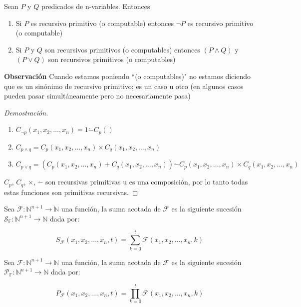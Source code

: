 \begin{proposition}
Sean $P$ y $Q$ predicados de n-variables. Entonces
 
\begin{enumerate}
	\item Si $P$ es recursivo primitivo (o computable) entonces $\neg P$ es recursivo primitivo (o computable)
	\item Si $P$ y $Q$ son recursivos primitivos (o computables) entonces $(P \wedge Q)$ y $(P \lor Q)$ son recursivos primitivos (o computables)
\end{enumerate}
 
\textbf{Observaci\'on} Cuando estamos poniendo ``(o computables)" no estamos diciendo que es un sin\'onimo de recursivo primitivo; es un caso u otro (en algunos casos pueden pasar simult\'aneamente pero no necesariamente pasa)
 
\begin{proof}[Demostraci\'on]
\hfill
\begin{enumerate}
	\item $C_{\neg p}(x_1, x_2, \ldots, x_n) = 1 \dot{-} C_p()$
	\item $C_{p \land q} = C_p(x_1, x_2, \ldots, x_n) \times C_q(x_1, x_2, \ldots, x_n)$
	\item $C_{p \lor q} = (C_p(x_1, x_2, \ldots, x_n) + C_q(x_1, x_2, \ldots, x_n)) \dot{-} C_p(x_1, x_2, \ldots, x_n) \times C_q(x_1, x_2, \ldots, x_n)$
\end{enumerate}
 
$C_p$, $C_q$, $\times$, $\dot{-}$ son recursivas primitivas u es una composici\'on, por lo tanto todas estas funciones son primitivas recursivas.
 
\end{proof}
 
\end{proposition}
 
\begin{definition}
Sea $\mathcal{F} : \mathbb{N}^{n + 1} \rightarrow \mathbb{N}$ una funci\'on, la suma acotada de $\mathcal{F}$ es la siguiente sucesi\'on $\mathcal{S}_{\mathbb{F}} : \mathbb{N}^{n + 1} \rightarrow \mathbb{N}$ dada por:
 
\[
S_{\mathcal{F}}(x_1, x_2, \ldots, x_n, t) = \sum_{k = 0}^{t} \mathcal{F}(x_1, x_2, \ldots, x_n, k)
\]
\end{definition}
 
\begin{definition}
Sea $\mathcal{F} : \mathbb{N}^{n + 1} \rightarrow \mathbb{N}$ una funci\'on, la suma acotada de $\mathcal{F}$ es la siguiente sucesi\'on $\mathcal{P}_{\mathbb{F}} : \mathbb{N}^{n + 1} \rightarrow \mathbb{N}$ dada por:
 
\[
P_{\mathcal{F}}(x_1, x_2, \ldots, x_n, t) = \prod_{k = 0}^{t} \mathcal{F}(x_1, x_2, \ldots, x_n, k)
\]
\end{definition}
 
